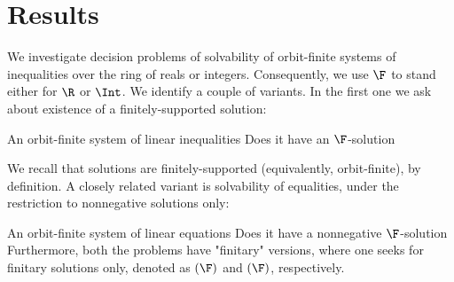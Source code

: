 


\section{Results} \label{sec:results}


We investigate decision problems of solvability of orbit-finite systems of inequalities over the ring of reals
or integers.
Consequently, we use $\F$ to stand either for $\R$ or $\Int$.
%
We identify a couple of variants. 
In the first one we ask about existence of a finitely-supported solution:

\prob{\ineqsolvname$(\F)$}
{An orbit-finite system of linear inequalities}
{Does it have an \xspace $\F$-solution}
%

\noindent
We recall that solutions are finitely-supported (equivalently, orbit-finite), by definition.
A closely related variant is solvability of equalities, under the restriction to nonnegative solutions only:

\prob{\nonnegsolvname$(\F)$}
{An orbit-finite system of linear equations}
{Does it have a nonnegative \xspace $\F$-solution}
%
\noindent
Furthermore, both the problems have "finitary" versions, where one seeks for finitary solutions only,
denoted as \finineqsolvname$(\F)$ and \finnonnegsolvname$(\F)$, respectively.

